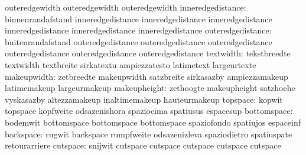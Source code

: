                                   outeredgewidth                   outeredgewidth
                                  outeredgewidth
               inneredgedistance: binnenrandafstand                inneredgedistance
                                  inneredgedistance                inneredgedistance
                                  inneredgedistance                inneredgedistance
                                  inneredgedistance
               outeredgedistance: buitenrandafstand                outeredgedistance
                                  outeredgedistance                outeredgedistance
                                  outeredgedistance                outeredgedistance
                                  outeredgedistance
                       textwidth: tekstbreedte                     textwidth
                                  textbreite                       sirkatextu
                                  ampiezzatesto                    latimetext
                                  largeurtexte
                     makeupwidth: zetbreedte                       makeupwidth
                                  satzbreite                       sirkasazby
                                  ampiezzamakeup                   latimemakeup
                                  largeurmakeup
                    makeupheight: zethoogte                        makeupheight
                                  satzhoehe                        vyskasazby
                                  altezzamakeup                    inaltimemakeup
                                  hauteurmakeup
                        topspace: kopwit                           topspace
                                  kopfweite                        odsazenishora
                                  spaziocima                       spatiusus
                                  espacesup
                     bottomspace: bodemwit                         bottomspace
                                  bottomspace                      bottomspace
                                  spaziofondo                      spatiujos
                                  espaceinf
                       backspace: rugwit                           backspace
                                  rumpfweite                       odsazenizleva
                                  spaziodietro                     spatiuspate
                                  retourarriere
                        cutspace: snijwit                          cutspace
                                  cutspace                         cutspace
                                  cutspace                         cutspace
